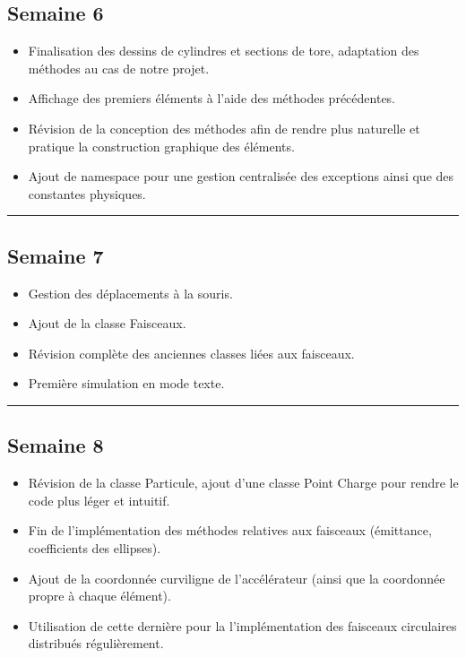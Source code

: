 \documentclass[12pt, letterpaper, twoside]{article}
\begin{document}
\subsection*{Semaine 6}
\begin{itemize}
\item Finalisation des dessins de cylindres et sections de tore, adaptation des méthodes au cas de notre projet.
\item Affichage des premiers éléments à l'aide des méthodes précédentes.
\item Révision de la conception des méthodes afin de rendre plus naturelle et pratique la construction graphique des éléments.
\item Ajout de namespace pour une gestion centralisée des exceptions ainsi que des constantes physiques.
\end{itemize}

\rule{\textwidth}{0.4pt}

\subsection*{Semaine 7}
\begin{itemize}
\item Gestion des déplacements à la souris.
\item Ajout de la classe Faisceaux.
\item Révision complète des anciennes classes liées aux faisceaux.
\item Première simulation en mode texte.
\end{itemize}

\rule{\textwidth}{0.4pt}

\subsection*{Semaine 8}
\begin{itemize}
\item Révision de la classe Particule, ajout d’une classe Point Charge pour rendre le code plus léger et intuitif.
\item Fin de l'implémentation des méthodes relatives aux faisceaux (émittance, coefficients des ellipses).
\item Ajout de la coordonnée curviligne de l’accélérateur (ainsi que la coordonnée propre à chaque élément).
\item Utilisation de cette dernière pour la l'implémentation des faisceaux circulaires distribués régulièrement.
\end{itemize}
\end{document}
